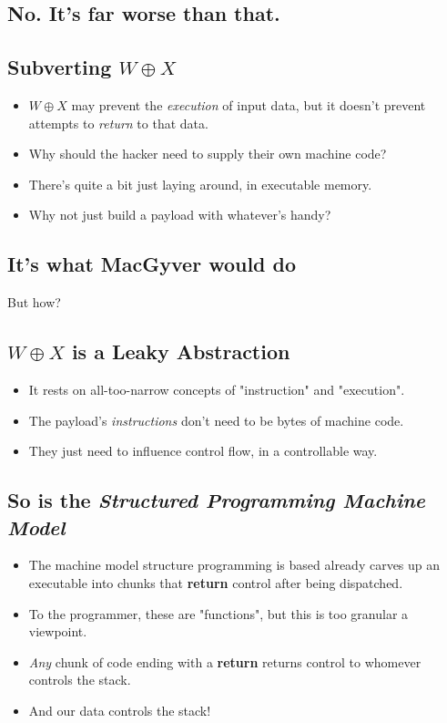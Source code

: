\documentclass[11pt]{article}
\begin{document}
\subsection*{No. It's far worse than that.}
\label{sec:org0b48e1a}
\subsection*{Subverting \(W\oplus X\)}
\label{sec:org74c23d3}
\begin{itemize}
\item \(W\oplus X\) may prevent the \emph{execution} of input data, but it doesn't prevent attempts to \emph{return} to that data.
\item Why should the hacker need to supply their own machine code?
\item There's quite a bit just laying around, in executable memory.
\item Why not just build a payload with whatever's handy?
\end{itemize}
\subsection*{It's what MacGyver would do}
\label{sec:orgb688c48}
But how?
\subsection*{\(W\oplus X\) is a Leaky Abstraction}
\label{sec:orgc11bf26}
\begin{itemize}
\item It rests on all-too-narrow concepts of "instruction" and "execution".
\item The payload's \emph{instructions} don't need to be bytes of machine code.
\item They just need to influence control flow, in a controllable way.
\end{itemize}
\subsection*{So is the \emph{Structured Programming Machine Model}}
\label{sec:orgba02378}
\begin{itemize}
\item The machine model structure programming is based already carves up an executable into chunks that \textbf{return} control after being dispatched.
\item To the programmer, these are "functions", but this is too granular a viewpoint.
\item \emph{Any} chunk of code ending with a \textbf{return} returns control to whomever controls the stack.
\item And our data controls the stack!
\end{itemize}
\end{document}

